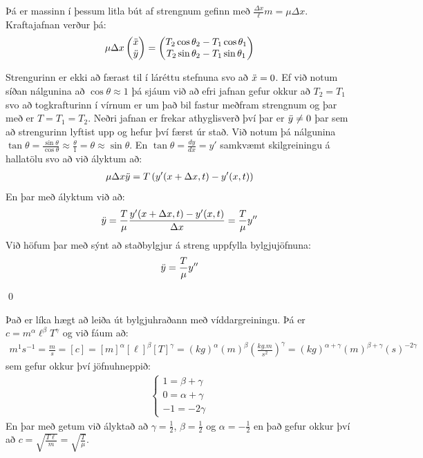 \vspace{-0.4cm}
Þá er massinn í þessum litla bút af strengnum gefinn með $\frac{\Delta x}{\ell} m = \mu \Delta x$. Kraftajafnan verður þá:
\begin{align*}
   \mu \Delta x \begin{pmatrix}  \Ddot{x} \\  \Ddot{y} \end{pmatrix} = \begin{pmatrix} T_2 \cos\theta_2 - T_1 \cos\theta_1 \\ T_2 \sin\theta_2 - T_1\sin\theta_1 \end{pmatrix}
\end{align*}

Strengurinn er ekki að færast til í láréttu stefnuna svo að $\Ddot{x} = 0$. Ef við notum síðan nálgunina að $\cos\theta \approx 1$ þá sjáum við að efri jafnan gefur okkur að $T_2 = T_1$ svo að togkrafturinn í vírnum er um það bil fastur meðfram strengnum og þar með er $T = T_1 = T_2$. Neðri jafnan er frekar athyglisverð því þar er $\Ddot{y} \neq 0$ þar sem að strengurinn lyftist upp og hefur því færst úr stað. Við notum þá nálgunina $\tan\theta = \frac{\sin\theta}{\cos\theta} \approx \frac{\theta}{1} = \theta \approx \sin\theta$. En $\tan\theta = \frac{dy}{dx} = y'$ samkvæmt skilgreiningu á hallatölu svo að við ályktum að:
\begin{align*}
    \mu \Delta x \Ddot{y} = T\left( y'(x+\Delta x,t) - y'(x,t) \right)
\end{align*}
En þar með ályktum við að:
\begin{align*}
    \Ddot{y} = \frac{T}{\mu} \frac{y'(x+\Delta x,t)-y'(x,t)}{\Delta x} = \frac{T}{\mu} y''
\end{align*}
Við höfum þar með sýnt að staðbylgjur á streng uppfylla bylgjujöfnuna:
\begin{align*}
    \Ddot{y} = \frac{T}{\mu} y''
\end{align*}

\qed

Það er líka hægt að leiða út bylgjuhraðann með víddargreiningu. Þá er $c = m^\alpha \ell^\beta T^\gamma$ og við fáum að:
\begin{align*}
  \si{m^1}\si{s^{-1}} = \frac{\si{m}}{\si{s}} = [c] = [m]^\alpha [\ell]^\beta [T]^\gamma = \left( \si{kg} \right)^\alpha \left( \si{m} \right)^\beta \left( \frac{\si{kg.m}}{\si{s^2}} \right)^\gamma = (\si{kg})^{\alpha + \gamma} (\si{m})^{\beta + \gamma} (s)^{-2\gamma}
\end{align*}
sem gefur okkur því jöfnuhneppið:
\begin{align*}
    \begin{cases}
    1 = \beta + \gamma \\
    0 = \alpha + \gamma \\
    -1 = -2\gamma
    \end{cases}
\end{align*}
En þar með getum við ályktað að $\gamma = \frac{1}{2}$, $\beta = \frac{1}{2}$ og $\alpha = -\frac{1}{2}$ en það gefur okkur því að $c = \sqrt{\frac{T\ell}{m}} = \sqrt{\frac{T}{\mu}}$.

